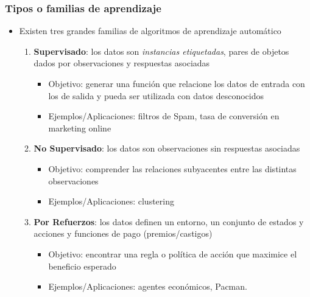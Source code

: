 \documentclass[leqno, 10pt, envcountsect]{beamer}
\numberwithin{equation}{section}
\theoremstyle{definition}
\theoremstyle{example}
\numberwithin{figure}{section}
\numberwithin{table}{section}
\let\olditem\item
\renewcommand{\item}{%
\olditem\vspace{1pt}}
\begin{document}
\begin{frame}
  \frametitle{Tipos o familias de aprendizaje}
  \begin{itemize}
    \item Existen tres grandes familias de algoritmos de aprendizaje automático
      \begin{enumerate}
        \item \textbf{Supervisado}: los datos son \textit{instancias
          etiquetadas}, pares de objetos dados por observaciones y respuestas
          asociadas
          \begin{itemize}
            \item Objetivo: generar una función que relacione los datos de
              entrada con los de salida y pueda ser utilizada con datos
              desconocidos
          \item Ejemplos/Aplicaciones: filtros de Spam, tasa de conversión en
            marketing online
          \end{itemize}
        \item \textbf{No Supervisado}: los datos son observaciones sin
          respuestas asociadas
          \begin{itemize}
            \item Objetivo: comprender las relaciones subyacentes entre las
              distintas observaciones
          \item Ejemplos/Aplicaciones: clustering
          \end{itemize}
        \item \textbf{Por Refuerzos}: los datos definen un entorno, un conjunto
          de estados y acciones y funciones de pago (premios/castigos)
        \begin{itemize}
          \item Objetivo: encontrar una regla o política de acción que maximice
            el beneficio esperado
          \item Ejemplos/Aplicaciones: agentes económicos, Pacman.
        \end{itemize}
      \end{enumerate}
  \end{itemize}
  \begin{center}

\end{center}
\end{frame}
\end{document}
